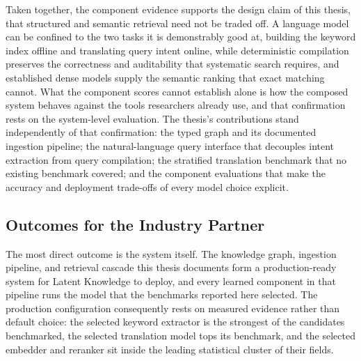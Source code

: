 Taken together, the component evidence supports the design claim of this thesis, that structured and semantic retrieval need not be traded off. A language model can be confined to the two tasks it is demonstrably good at, building the keyword index offline and translating query intent online, while deterministic compilation preserves the correctness and auditability that systematic search requires, and established dense models supply the semantic ranking that exact matching cannot. What the component scores cannot establish alone is how the composed system behaves against the tools researchers already use, and that confirmation rests on the system-level evaluation. The thesis's contributions stand independently of that confirmation: the typed graph and its documented ingestion pipeline; the natural-language query interface that decouples intent extraction from query compilation; the stratified translation benchmark that no existing benchmark covered; and the component evaluations that make the accuracy and deployment trade-offs of every model choice explicit.

\subsection{Outcomes for the Industry Partner}
\label{sec:conclusion-partner}

The most direct outcome is the system itself. The knowledge graph, ingestion pipeline, and retrieval cascade this thesis documents form a production-ready system for Latent Knowledge to deploy, and every learned component in that pipeline runs the model that the benchmarks reported here selected. The production configuration consequently rests on measured evidence rather than default choice: the selected keyword extractor is the strongest of the candidates benchmarked, the selected translation model tops its benchmark, and the selected embedder and reranker sit inside the leading statistical cluster of their fields.

